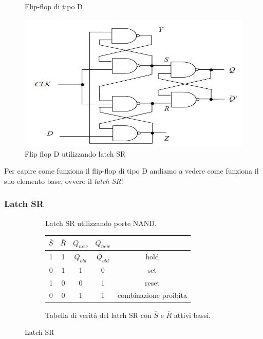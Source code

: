\documentclass[
]{book}
\begin{document}
\begin{figure}[H]
    \centering
    \resizebox{0.2\textwidth}{!}{}
    \caption{Flip-flop di tipo D}
\end{figure}

\begin{figure}
\centering
\includegraphics[width=0.5\linewidth,height=\textheight,keepaspectratio]{assets/imgs/ffd_latch_sr.png}
\caption{Flip flop D utilizzando latch SR}
\end{figure}

Per capire come funziona il flip-flop di tipo D andiamo a vedere come
funziona il suo elemento base, ovvero il \emph{latch SR}!

\subsubsection{Latch SR}\label{latch-sr}

\begin{figure}[H] 
\centering
\begin{subfigure}{.45\textwidth}

\caption{Latch SR utilizzando porte NAND.}
\label{fig:sr_latch}
\end{subfigure}
\hspace*{\fill}
\begin{subfigure}{.45\textwidth}
\centering
\begin{tabular}{ccccc} 
\hline
$\overline{S}$ & $\overline{R}$ & $Q_{new}$ & $\overline{Q_{new}}$ &  \\ 
\hline
1 & 1 & $Q_{old}$ & $\overline{Q_{old}}$ & hold \\
0 & 1 & 1 & 0 & set \\
1 & 0 & 0 & 1 & reset \\
0 & 0 & 1 & 1 & combinazione proibita \\
\hline
\end{tabular}
\caption{Tabella di verità del latch SR con $\overline{S}$ e $\overline{R}$ attivi bassi.}
\label{tab:latch_sr}
\vfill
\end{subfigure}
\caption{Latch SR}
\end{figure}
\end{document}
